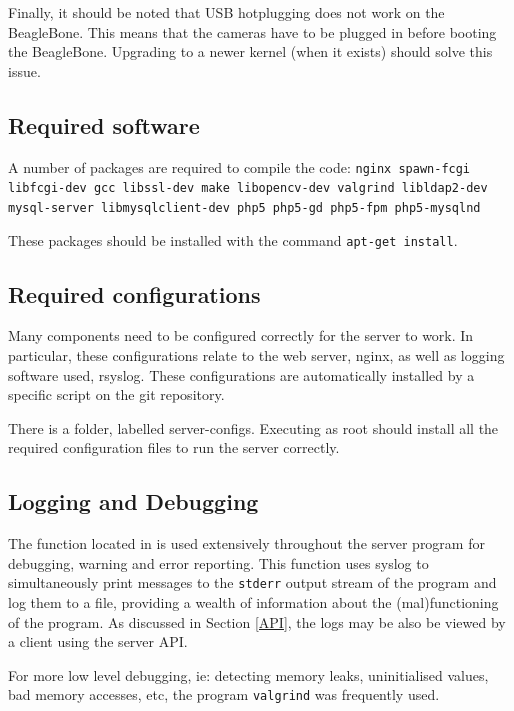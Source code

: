 Finally, it should be noted that USB hotplugging does not work on the BeagleBone. This means that the cameras have to be plugged in before booting the BeagleBone. Upgrading to a newer kernel (when it exists) should solve this issue.


\subsection{Required software}
A number of packages are required to compile the code:
\texttt{nginx spawn-fcgi libfcgi-dev gcc libssl-dev make libopencv-dev valgrind libldap2-dev mysql-server libmysqlclient-dev php5 php5-gd php5-fpm php5-mysqlnd}

These packages should be installed with the command \texttt{apt-get install}.

\subsection{Required configurations}
Many components need to be configured correctly for the server to work. In particular, these configurations relate to the web server, nginx, as well as logging software used, rsyslog. These configurations are automatically installed by a specific script on the git repository.

There is a folder, labelled server-configs. Executing  as root should install all the required configuration files to run the server correctly.


\subsection{Logging and Debugging}

The function  located in  is used extensively throughout the server program for debugging, warning and error reporting. This function uses syslog to simultaneously print messages to the \texttt{stderr} output stream of the program and log them to a file, providing a wealth of information about the (mal)functioning of the program. As discussed in Section \ref{API}, the logs may be also be viewed by a client using the server API.

For more low level debugging, ie: detecting memory leaks, uninitialised values, bad memory accesses, etc, the program \texttt{valgrind}\cite{valgrind} was frequently used.



